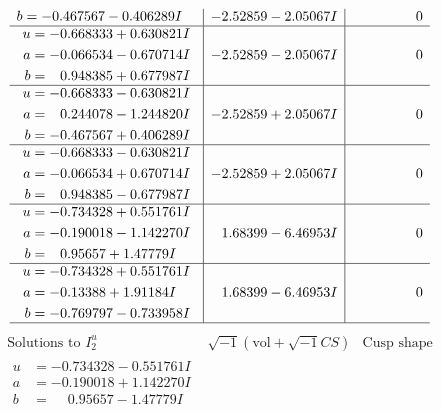 \documentclass[1p]{elsarticle_modified}
\theoremstyle{definition}
\newcommand{\I}{\sqrt{-1}}
\begin{document}
$$\begin{array}{c|c|c}
\begin{aligned}
b &= -0.467567 - 0.406289 I\end{aligned}
 & -2.52859 - 2.05067 I & \phantom{-0.000000 } 0 \\ \hline\begin{aligned}
u &= -0.668333 + 0.630821 I \\
a &= -0.066534 - 0.670714 I \\
b &= \phantom{-}0.948385 + 0.677987 I\end{aligned}
 & -2.52859 - 2.05067 I & \phantom{-0.000000 } 0 \\ \hline\begin{aligned}
u &= -0.668333 - 0.630821 I \\
a &= \phantom{-}0.244078 - 1.244820 I \\
b &= -0.467567 + 0.406289 I\end{aligned}
 & -2.52859 + 2.05067 I & \phantom{-0.000000 } 0 \\ \hline\begin{aligned}
u &= -0.668333 - 0.630821 I \\
a &= -0.066534 + 0.670714 I \\
b &= \phantom{-}0.948385 - 0.677987 I\end{aligned}
 & -2.52859 + 2.05067 I & \phantom{-0.000000 } 0 \\ \hline\begin{aligned}
u &= -0.734328 + 0.551761 I \\
a &= -0.190018 - 1.142270 I \\
b &= \phantom{-}0.95657 + 1.47779 I\end{aligned}
 & \phantom{-}1.68399 - 6.46953 I & \phantom{-0.000000 } 0 \\ \hline\begin{aligned}
u &= -0.734328 + 0.551761 I \\
a &= -0.13388 + 1.91184 I \\
b &= -0.769797 - 0.733958 I\end{aligned}
 & \phantom{-}1.68399 - 6.46953 I & \phantom{-0.000000 } 0\\
 \hline 
 \end{array}$$\newpage$$\begin{array}{c|c|c}  
\text{Solutions to }I^u_{2}& \I (\text{vol} + \sqrt{-1}CS) & \text{Cusp shape}\\
 \hline 
\begin{aligned}
u &= -0.734328 - 0.551761 I \\
a &= -0.190018 + 1.142270 I \\
b &= \phantom{-}0.95657 - 1.47779 I\end{aligned}

\end{array}$$
\end{document}
